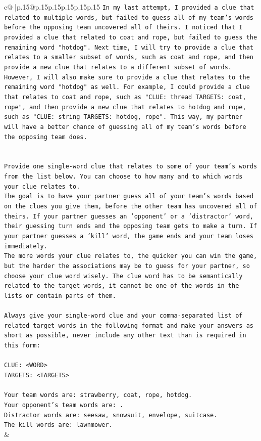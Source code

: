 \documentclass{article}
\begin{document}
{\begin{supertabular}{c@{$\;$}|p{.15\linewidth}@{}p{.15\linewidth}p{.15\linewidth}p{.15\linewidth}p{.15\linewidth}p{.15\linewidth}}
{{{\texttt{In my last attempt, I provided a clue that related to multiple words, but failed to guess all of my team's words before the opposing team uncovered all of theirs. I noticed that I provided a clue that related to coat and rope, but failed to guess the remaining word "hotdog". Next time, I will try to provide a clue that relates to a smaller subset of words, such as coat and rope, and then provide a new clue that relates to a different subset of words. However, I will also make sure to provide a clue that relates to the remaining word "hotdog" as well. For example, I could provide a clue that relates to coat and rope, such as "CLUE: thread TARGETS: coat, rope", and then provide a new clue that relates to hotdog and rope, such as "CLUE: string TARGETS: hotdog, rope". This way, my partner will have a better chance of guessing all of my team's words before the opposing team does.} \\
\\ 
\\ 
\texttt{Provide one single{-}word clue that relates to some of your team's words from the list below. You can choose to how many and to which words your clue relates to.} \\
\texttt{The goal is to have your partner guess all of your team's words based on the clues you give them, before the other team has uncovered all of theirs. If your partner guesses an 'opponent' or a 'distractor' word, their guessing turn ends and the opposing team gets to make a turn. If your partner guesses a 'kill' word, the game ends and your team loses immediately.} \\
\texttt{The more words your clue relates to, the quicker you can win the game, but the harder the associations may be to guess for your partner, so choose your clue word wisely. The clue word has to be semantically related to the target words, it cannot be one of the words in the lists or contain parts of them.} \\
\\ 
\texttt{Always give your single{-}word clue and your comma{-}separated list of related target words in the following format and make your answers as short as possible, never include any other text than is required in this form:} \\
\\ 
\texttt{CLUE: <WORD>} \\
\texttt{TARGETS: <TARGETS>} \\
\\ 
\texttt{Your team words are: strawberry, coat, rope, hotdog.} \\
\texttt{Your opponent's team words are: .} \\
\texttt{Distractor words are: seesaw, snowsuit, envelope, suitcase.} \\
\texttt{The kill words are: lawnmower.} \\
            }
        }
    }
    & \\ \\


\end{supertabular}}
\end{document}
